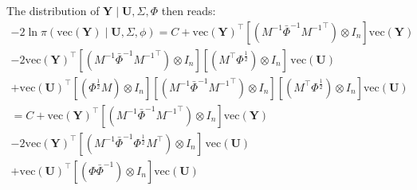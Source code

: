 \documentclass{article}
\begin{document}
The distribution of $\mathbf{Y} \mid \mathbf{U}, \Sigma, \Phi $ then reads:
\begin{align*}
-2 \ln \pi \left(\mathrm{vec}(\mathbf{Y}) \mid \mathbf{U}, \Sigma, \phi \right) %
%
%
 = C + 
%
\mathrm{vec}(\mathbf{Y})^{\top}
\left[ \left(
 M^{-1} \bar{\Phi}^{-1}{M^{-1}}^\top
\right) \otimes I_n \right] 
\mathrm{vec}(\mathbf{Y}) \\ 
%
- 2\mathrm{vec}(\mathbf{Y})^{\top} 
\left[ \left( 
 M^{-1} \bar{\Phi}^{-1}{M^{-1}}^\top\right) \otimes I_n \right] 
\left[ \left( M^\top \Phi^{\frac{1}{2}} \right) \otimes I_n \right] \,\mathrm{vec}(\mathbf{U})   \\
%
+  \mathrm{vec}(\mathbf{U})^{\top}
    \left[ \left(\Phi^{\frac{1}{2}} M \right) \otimes I_n \right]
    \left[ \left(  M^{-1} \bar{\Phi}^{-1}{M^{-1}}^\top\right) \otimes I_n \right]
    \left[ (M^\top\Phi^{\frac{1}{2}} ) \otimes I_n \right]
   \mathrm{vec}(\mathbf{U}) \\
%
= C + \mathrm{vec}(\mathbf{Y})^{\top}
\left[ \left(
 M^{-1} \bar{\Phi}^{-1}{M^{-1}}^\top
\right) \otimes I_n \right] 
\mathrm{vec}(\mathbf{Y}) \\ 
%
- 2\mathrm{vec}(\mathbf{Y})^{\top} 
\left[ \left(  M^{-1} \bar{\Phi}^{-1} \Phi^{\frac{1}{2}} M^{\top} \right)
\otimes I_n \right]  \,\mathrm{vec}(\mathbf{U})   \\
%
+  \mathrm{vec}(\mathbf{U})^{\top}
    \left[ \left(  \Phi  \bar{\Phi}^{-1}  \right) \otimes I_n \right]
   \mathrm{vec}(\mathbf{U})
\end{align*}
\end{document}
